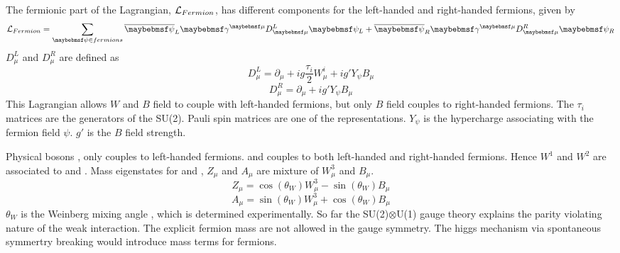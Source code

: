 The fermionic part of the Lagrangian,   $\operatorname{\mathcal{L}}_{Fermion}$, has different components for the left-handed and right-handed fermions, given by
\begin{equation}
\Lagr_{Fermion} = \sum_{\psi\in{fermions}} {\overline{\psi}}_L \gamma^{\mu}D^L_{\mu} \psi_L +  \overline{\psi}_R \gamma^{\mu}D^R_{\mu} \psi_R
\end{equation}
$D^L_{\mu}$ and $D^R_{\mu}$ are defined as
\begin{equation}
D^L_{\mu} = \partial_{\mu} + ig\frac{\tau_i}{2}W^i_{\mu} + ig'Y_{\psi}B_{\mu}
\end{equation}
\begin{equation}
D^R_{\mu} = \partial_{\mu}  + ig'Y_{\psi}B_{\mu}
\end{equation}
This Lagrangian allows $W$ and $B$ field to couple with left-handed fermions, but only $B$ field couples to right-handed fermions. The $\tau_i$ matrices are the generators of the SU(2). Pauli spin matrices are one of the representations. $Y_{\psi}$ is the hypercharge associating with the fermion field $\psi$. $g'$ is the $B$ field strength.

Physical bosons \PWp, \PWm  only couples to left-handed fermions. \PZ and \Pgamma couples to both left-handed and right-handed fermions. Hence $W^1$ and $W^2$ are associated to \PWp and \PWm. Mass eigenstates for \PZ and \Pgamma, $Z_{\mu}$ and $A_{\mu}$ are mixture of $W^3_{\mu}$ and $B_{\mu}$.
\begin{equation}
Z_{\mu} = \cos\left(\theta_W\right)W^3_{\mu} - \sin\left(\theta_W\right)B_{\mu}
\end{equation}
\begin{equation}
A_{\mu} = \sin\left(\theta_W\right)W^3_{\mu} + \cos\left(\theta_W\right)B_{\mu}
\end{equation}
$\theta_W$ is the Weinberg mixing angle \cite{Weinberg:1967tq}, which is determined experimentally. So far the SU(2)$\otimes$U(1) gauge theory explains the parity violating nature of the weak interaction. The explicit fermion mass are not allowed in the gauge symmetry. The higgs mechanism via spontaneous symmertry breaking would introduce mass terms for fermions.

